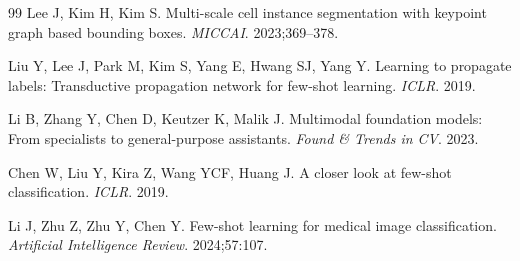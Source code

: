 \documentclass[preprint,review,12pt]{elsarticle}
\begin{document}
\begin{thebibliography}{99}
Lee J, Kim H, Kim S.
Multi-scale cell instance segmentation with keypoint graph based bounding boxes.
\textit{MICCAI}. 2023;369--378.

Liu Y, Lee J, Park M, Kim S, Yang E, Hwang SJ, Yang Y.
Learning to propagate labels: Transductive propagation network for few-shot learning.
\textit{ICLR}. 2019.

Li B, Zhang Y, Chen D, Keutzer K, Malik J.
Multimodal foundation models: From specialists to general-purpose assistants.
\textit{Found \& Trends in CV}. 2023.

Chen W, Liu Y, Kira Z, Wang YCF, Huang J.
A closer look at few-shot classification.
\textit{ICLR}. 2019.

Li J, Zhu Z, Zhu Y, Chen Y.
Few-shot learning for medical image classification.
\textit{Artificial Intelligence Review}. 2024;57:107.

\end{thebibliography}
\end{document}
